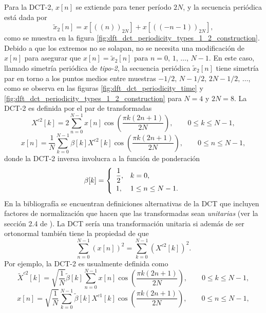 \documentclass[a4paper]{report}
\begin{document}
Para la DCT-2, \(x[n]\) se extiende para tener período \(2N\), y la secuencia periódica está dada por 
\begin{equation}\label{eq:dft_dct_periodic_extension_type_2}
 \tilde{x}_2[n]=x[((n))_{2N}]+x[((-n-1))_{2N}], 
\end{equation}
como se muestra en la figura \ref{fig:dft_dct_periodicity_types_1_2_construction}. Debido a que los extremos no se solapan, no se necesita una modificación de \(x[n]\) para asegurar que \(x[n]=\tilde{x}_2[n]\) para \(n=0,\,1,\,\dots,\,N-1\). En este caso, llamado simetría periódica de \emph{tipo-2}, la secuencia periódica \(\tilde{x}_2[n]\) tiene simetría par en torno a los puntos medios entre muestras \(-1/2,\,N-1/2,\,2N-1/2,\,\dots\), como se observa en las figuras \ref{fig:dft_dct_periodicity_time} y \ref{fig:dft_dct_periodicity_types_1_2_construction} para \(N=4\) y \(2N=8\). La DCT-2 es definida por el par de transformadas
\begin{equation}\label{eq:dft_dct_2_definition}
 X^{c2}[k]=2\sum_{n=0}^{N-1}x[n]\cos\left(\frac{\pi k(2n+1)}{2N}\right),
 \qquad 0\leq k\leq N-1,
\end{equation}
\begin{equation}\label{eq:dft_dct_2_inverse_definition}
 x[n]=\frac{1}{N}\sum_{k=0}^{N-1}\beta[k]X^{c2}[k]\cos\left(\frac{\pi k(2n+1)}{2N}\right),
 \qquad 0\leq n\leq N-1,
\end{equation}
donde la DCT-2 inversa involucra a la función de ponderación
\begin{equation}\label{eq:dft_dct_2_inverse_definition_beta}
 \beta[k]=
 \left\{ 
 \begin{array}{ll}
  \dfrac{1}{2}, & k=0,\\[\medskipamount]
  1, & 1\leq n\leq N-1.
 \end{array}
 \right.  
\end{equation}
En la bibliografía se encuentran definiciones alternativas de la DCT que incluyen factores de normalización que hacen que las transformadas sean \emph{unitarias} (ver la sección 2.4 de \cite{rao1990discrete}). La DCT sería una transformación unitaria si además de ser ortonormal también tiene la propiedad de que 
\[ 
\sum_{n=0}^{N-1}(x[n])^2=\sum_{k=0}^{N-1}(X^{c2}[k])^2.
\]
Por ejemplo, la DCT-2 es usualmente definida como
\[
 \tilde{X}^{c2}[k]=\sqrt{\frac{1}{N}}\tilde{\beta}[k]\sum_{n=0}^{N-1}x[n]\cos\left(\frac{\pi k(2n+1)}{2N}\right),
 \qquad 0\leq k\leq N-1,
\]
\[
 x[n]=\sqrt{\frac{1}{N}}\sum_{k=0}^{N-1}\tilde{\beta}[k]X^{c1}[k]\cos\left(\frac{\pi k(2n+1)}{2N}\right),
 \qquad 0\leq n\leq N-1,
\]
\end{document}
